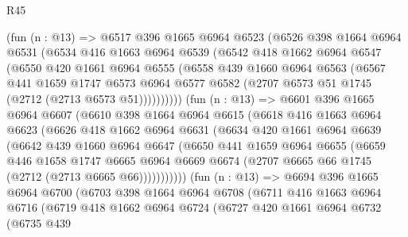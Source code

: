 \begin{lexlean}{R45}
\begin{coremodule}
        (fun (n : @13) =>
        @6517
          @396
          @1665
          @6964
          @6523
          (@6526
            @398
            @1664
            @6964
            @6531
            (@6534
              @416
              @1663
              @6964
              @6539
              (@6542
                @418
                @1662
                @6964
                @6547
                (@6550
                  @420
                  @1661
                  @6964
                  @6555
                  (@6558
                    @439
                    @1660
                    @6964
                    @6563
                    (@6567
                      @441
                      @1659
                      @1747
                      @6573
                      @6964
                      @6577
                      @6582
                      (@2707 @6573 @51 @1745 (@2712 (@2713 @6573 @51))))))))))
        (fun (n : @13) =>
        @6601
          @396
          @1665
          @6964
          @6607
          (@6610
            @398
            @1664
            @6964
            @6615
            (@6618
              @416
              @1663
              @6964
              @6623
              (@6626
                @418
                @1662
                @6964
                @6631
                (@6634
                  @420
                  @1661
                  @6964
                  @6639
                  (@6642
                    @439
                    @1660
                    @6964
                    @6647
                    (@6650
                      @441
                      @1659
                      @6964
                      @6655
                      (@6659
                        @446
                        @1658
                        @1747
                        @6665
                        @6964
                        @6669
                        @6674
                        (@2707 @6665 @66 @1745 (@2712 (@2713 @6665 @66)))))))))))
        (fun (n : @13) =>
        @6694
          @396
          @1665
          @6964
          @6700
          (@6703
            @398
            @1664
            @6964
            @6708
            (@6711
              @416
              @1663
              @6964
              @6716
              (@6719
                @418
                @1662
                @6964
                @6724
                (@6727
                  @420
                  @1661
                  @6964
                  @6732
                  (@6735
                    @439

\end{coremodule}
\end{lexlean}
